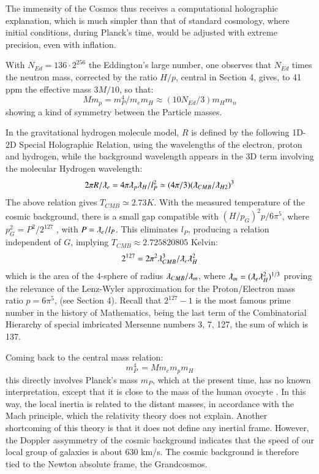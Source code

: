 \documentclass[twoside,draft]{article}
\begin{document}
\begin{sloppypar}
{The immensity of the Cosmos thus receives a computational holographic explanation, which is much simpler
than that of standard cosmology, where initial conditions, during Planck's time, would be adjusted with
extreme precision, even with inflation. 

With $N_{Ed} = 136 \cdot2^{256}$ the Eddington's large number, one observes that $N_{Ed}$ times the neutron mass, corrected by the ratio $H/p$, central in Section 4, gives, to 41 ppm the effective mass $3M/10$, so that:
\begin{equation}
Mm_p = m_P^4/m_em_H\approx(10N_{Ed}/3)m_Hm_n 
\end{equation}
showing a kind of symmetry between the Particle masses.

In the gravitational hydrogen molecule model, $R$ is defined by the following 1D-2D Special
Holographic Relation, using the wavelengths of the electron, proton and hydrogen, while the background wavelength appears in the 3D term involving the molecular Hydrogen wavelength:
\begin{equation}
2 \pi R/\lambdabar_{e} = 4 \pi \lambdabar_{p} \lambdabar_{H} /l_{P}^2 \simeq (4\pi/3)(\lambdabar_{CMB} /\lambdabar_{H2})^{3}
\end{equation}
The above relation gives $T_{CMB} \simeq 2.73 K$. With the measured temperature of the cosmic
background, there is a small gap compatible with $(H/p_G)^2 p/6\pi^5 $, where $p_{G}^{2} = P^{2} /2^{127}$ , with $P = \lambdabar_{e} /l_{P}$. 
This eliminates $l_{P}$, producing a relation independent of $G$, implying $T_{CMB} \approx 2.725820805$ Kelvin:
$$2^{127} = 2\pi^{2} \lambda_{CMB}^{3} /\lambdabar_{e} \lambdabar_{H}^2$$
which is the area of the 4-sphere of radius $\lambda_{CMB} / \lambdabar_{m}$, where $\lambdabar_{m} = (\lambdabar_{e} \lambdabar_{H}^2)^{1/3} $ proving the relevance of
the Lenz-Wyler approximation for the Proton/Electron mass ratio $p = 6\pi^{5}$, (see Section 4). Recall
that $2^{127} - 1$ is the most famous prime number in the history of Mathematics, being the last term of
the Combinatorial Hierarchy \cite{Sanchez1} of special imbricated Mersenne numbers 3, 7, 127, the sum of which is 137.

Coming back to the central mass relation:
\begin{equation}
m_{P}^{4}\, = M m_{e} m_{p} m_{H}
\end{equation}
this directly involves Planck's mass $m_{P}$, which at the present time, has no known interpretation, except
that it is close to the mass of the human ovocyte \cite{Sanchez1}. In this way, the local inertia is related to the distant
masses, in accordance with the Mach principle, which the relativity theory does not explain.
Another shortcoming of this theory is that it does not define any inertial frame. However, the
Doppler assymmetry of the cosmic background indicates that the speed of our local group of galaxies is about
630 km/s. The cosmic background is therefore tied to the Newton absolute frame, the Grandcosmos.

}
\end{sloppypar}
\end{document}
